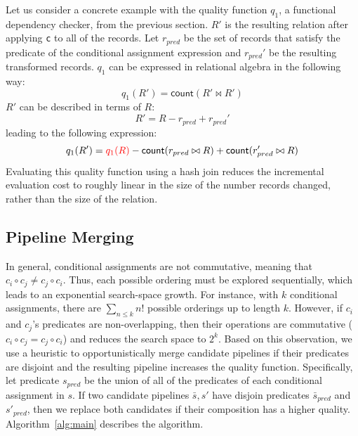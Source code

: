 Let us consider a concrete example with the quality function $q_1$, a functional dependency checker, from the previous section.
$R'$ is the resulting relation after applying \texttt{c} to all of the records.
Let $r_{pred}$ be the set of records that satisfy the predicate of the conditional assignment expression and $r_{pred}'$ be the resulting transformed records.
$q_1$ can be expressed in relational algebra in the following way:
\[
q_1(R') = \textsf{count}( R' \bowtie R' )
\]
$R'$ can be described in terms of $R$:
\[
R' = R - r_{pred} + r_{pred}' 
\]
leading to the following expression:
\[
q_1(R') = \textcolor{red}{q_1(R)} - \textsf{count}( r_{pred} \bowtie R )  + \textsf{count}( r'_{pred} \bowtie R )
\]
Evaluating this quality function using a hash join reduces the incremental evaluation cost to roughly linear in the size of the number records changed, rather than the size of the relation.



\subsection{Pipeline Merging}
In general, conditional assignments are not commutative, meaning that $c_i\circ c_j \ne c_j\circ c_i$.  Thus, each possible ordering must be explored sequentially, which leads to an exponential search-space growth.  For instance, with $k$ conditional assignments, there are $\sum_{n\le k} n!$ possible orderings up to length $k$.  However, if $c_i$ and $c_j$'s predicates are non-overlapping, then their operations are commutative ($c_i\circ c_j = c_j\circ c_i$) and reduces the search space to $2^k$.  Based on this observation, we use a heuristic to opportunistically merge candidate pipelines if their predicates are disjoint and the resulting pipeline increases the quality function.  Specifically, let predicate $s_{pred}$ be the union of all of the predicates of each conditional assignment in $s$.  If two candidate pipelines $\bar{s},s'$ have disjoin predicates $\bar{s}_{pred}$ and $s'_{pred}$, then we replace both candidates if their composition has a higher quality.  Algorithm~\ref{alg:main} describes the algorithm.


